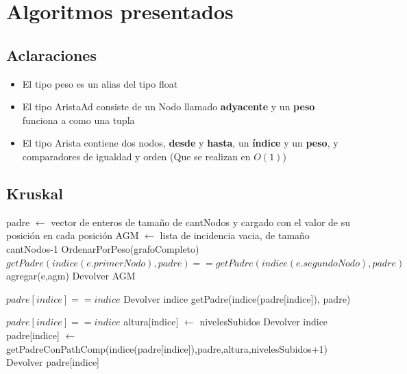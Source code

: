 \documentclass[11pt,a4paper]{article}
\begin{document}
\section{Algoritmos presentados}

\subsection{Aclaraciones}
\begin{itemize}
	\item El tipo peso es un alias del tipo float
	\item El tipo AristaAd consiste de un Nodo llamado \textbf{adyacente} y un \textbf{peso} funciona a como una tupla
	\item El tipo Arista contiene dos nodos, \textbf{desde} y \textbf{hasta}, un \textbf{índice} y un \textbf{peso}, y comparadores de igualdad y orden (Que se realizan en $O(1)$) 
\end{itemize}

\subsection{Kruskal}
\begin{codebox}
		\li padre $\gets$ vector de enteros de tamaño de cantNodos y cargado con el valor
		\zi 	 de su posición en cada posición
		\li AGM $\gets$ lista de incidencia vacia, de tamaño cantNodos-1
		\li OrdenarPorPeso(grafoCompleto)
		\li {} \Do
			\li \If $getPadre(indice(e.primerNodo), padre) == getPadre(indice(e.segundoNodo),padre)$ \Then
					\li agregar(e,agm)
				\End
			\End
	\li Devolver AGM
\end{codebox}

\begin{codebox}
\li \If $padre[indice] == indice$ \Then
		\li Devolver indice
\li \Else
		\li getPadre(indice(padre[indice]), padre)
\li \End
\end{codebox}


\begin{codebox}
\li \If $padre[indice] == indice$ \Then
		\li altura[indice] $\gets$ nivelesSubidos
		\li Devolver indice
	\li \Else
		\li padre[indice] $\gets$ getPadreConPathComp(indice(padre[indice]),padre,altura,nivelesSubidos+1)
		\li Devolver padre[indice]
		\End
\end{codebox}
\end{document}
